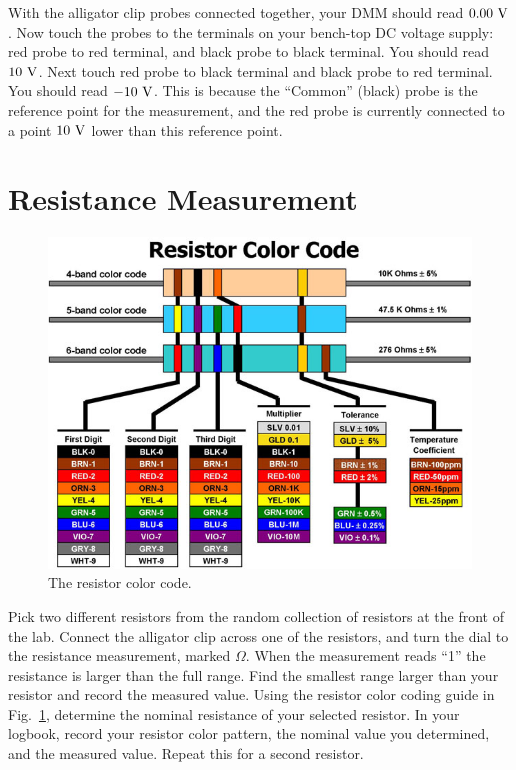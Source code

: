With the alligator clip probes connected together, your DMM should
read $0.00~\rm V$.  Now touch the probes to the terminals on your
bench-top DC voltage supply: red probe to red terminal, and black
probe to black terminal.  You should read $10~\rm V$.  Next touch red
probe to black terminal and black probe to red terminal.  You should
read $-10~\rm V$.  This is because the ``Common'' (black) probe is the
reference point for the measurement, and the red probe is currently
connected to a point $10~\rm V$ lower than this reference point.

\section{Resistance Measurement}

\begin{figure}[htbp]
\begin{center}
\includegraphics[height=0.45\textheight]{figs/labs/dc_circuits/rcolor.jpg}
\caption{The resistor color code.}
\label{fig:rcolor}
\end{center}
\end{figure}

Pick two different resistors from the random collection of resistors
at the front of the lab.  Connect the alligator clip across one of the
resistors, and turn the dial to the resistance measurement, marked
$\Omega$.  When the measurement reads ``1'' the resistance is larger
than the full range.  Find the smallest range larger than your
resistor and record the measured value.  Using the resistor color
coding guide in Fig.~\ref{fig:rcolor}, determine the nominal
resistance of your selected resistor.  In your logbook, record your
resistor color pattern, the nominal value you determined, and the
measured value.  Repeat this for a second resistor.


